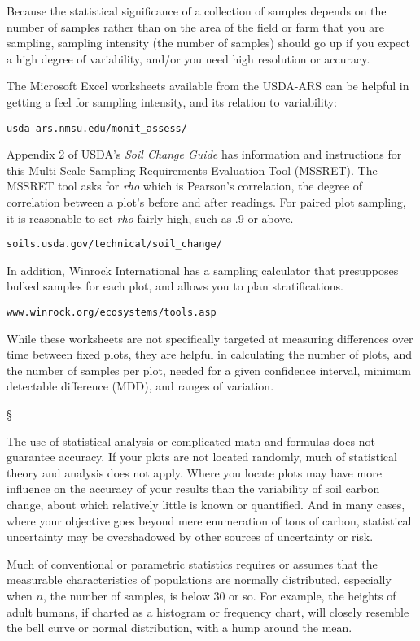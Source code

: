 \documentclass[11pt,letterpaper,oneside,onecolumn]{memoir}
\begin{document}
Because the statistical significance of a collection of samples depends on the number of samples rather than on the area of the field or farm that you are sampling, sampling intensity (the number of samples) should go up if you expect a high degree of variability, and/or you need high resolution or accuracy.

The Microsoft Excel worksheets available from the USDA-ARS can be helpful in getting a feel for sampling intensity, and its relation to variability:\label{spreadsheet tools}

\texttt{usda-ars.nmsu.edu/monit\_assess/}

Appendix 2 of USDA's \textit{Soil Change Guide} has information and instructions for this Multi-Scale Sampling Requirements Evaluation Tool (MSSRET). The MSSRET tool asks for \textit{rho} which is Pearson's correlation, the degree of correlation between a plot's before and after readings. For paired plot sampling, it is reasonable to set \textit{rho} fairly high, such as .9 or above.

\texttt{soils.usda.gov/technical/soil\_change/}

In addition, Winrock International has a sampling calculator that presupposes bulked samples for each plot, and allows you to plan stratifications.

\texttt{www.winrock.org/ecosystems/tools.asp}

\noindent While these worksheets are not specifically targeted at measuring differences over time between fixed plots, they are helpful in calculating the number of plots, and the number of samples per plot, needed for a given confidence interval, minimum detectable difference (MDD), and ranges of variation.
\begin{center}
\S
\end{center}
\noindent The use of statistical analysis or complicated math and formulas does not guarantee accuracy. If your plots are not located randomly, much of statistical theory and analysis does not apply. Where you locate plots may have more influence on the accuracy of your results than the variability of soil carbon change, about which relatively little is known or quantified. And in many cases, where your objective goes beyond mere enumeration of tons of carbon, statistical uncertainty may be overshadowed by other sources of uncertainty or risk.

Much of conventional or parametric statistics requires or assumes that the measurable characteristics of populations are normally distributed, especially when $n$, the number of samples, is below 30 or so. For example, the heights of adult humans, if charted as a histogram or frequency chart, will closely resemble the bell curve or normal distribution, with a hump around the mean.
\end{document}
